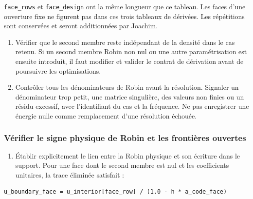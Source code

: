 \documentclass[11pt,a4paper]{article}
\begin{document}
   {\small\ttfamily \nolinkurl{face_rows}} et {\small\ttfamily \nolinkurl{face_design}} ont la même longueur que ce tableau. Les faces d'une ouverture fixe ne figurent pas dans ces trois tableaux de dérivées. Les répétitions sont conservées et seront additionnées par Joachim.
\begin{enumerate}
\item Vérifier que le second membre reste indépendant de la densité dans le cas retenu. Si un second membre Robin non nul ou une autre paramétrisation est ensuite introduit, il faut modifier et valider le contrat de dérivation avant de poursuivre les optimisations.
\item Contrôler tous les dénominateurs de Robin avant la résolution. Signaler un dénominateur trop petit, une matrice singulière, des valeurs non finies ou un résidu excessif, avec l'identifiant du cas et la fréquence. Ne pas enregistrer une énergie nulle comme remplacement d'une résolution échouée.
\end{enumerate}

\subsubsection{Vérifier le signe physique de Robin et les frontières ouvertes}

\begin{enumerate}
\item Établir explicitement le lien entre la Robin physique et son écriture dans le support. Pour une face dont le second membre est nul et les coefficients unitaires, la trace éliminée satisfait :
\end{enumerate}

\begin{Verbatim}[breaklines,breakanywhere,fontsize=\footnotesize]
   u_boundary_face = u_interior[face_row] / (1.0 - h * a_code_face)
\end{Verbatim}
\end{document}

